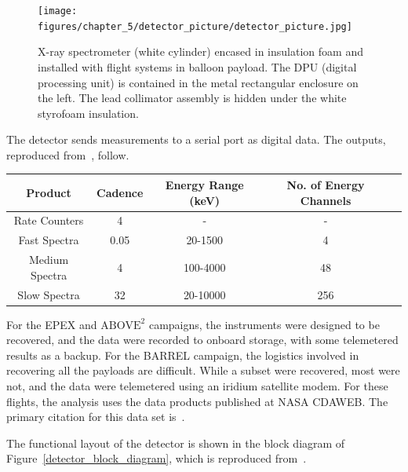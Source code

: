 \begin{figure}[p]
    \centering
    \texttt{[image: figures/chapter\_5/detector\_picture/detector\_picture.jpg]}
    \caption{X-ray spectrometer (white cylinder) encased in insulation foam and installed with flight systems in balloon payload. The DPU (digital processing unit) is contained in the metal rectangular enclosure on the left. The lead collimator assembly is hidden under the white styrofoam insulation.}
    \label{detector_picture}
\end{figure}

The detector sends measurements to a serial port as digital data. The outputs, reproduced from~\citet{Millan2014}, follow.

\begin{center}
\begin{tabular}{ |c|c|c|c|c| }
\hline
Product & Cadence & Energy Range (keV) & No. of Energy Channels \\
\hline
Rate Counters & 4 & - & - \\
Fast Spectra & 0.05 & 20-1500 & 4 \\
Medium Spectra & 4 & 100-4000 & 48 \\
Slow Spectra & 32 & 20-10000 & 256 \\
\hline
\end{tabular}
\end{center}

For the EPEX and $\text{ABOVE}^2$ campaigns, the instruments were designed to be recovered, and the data were recorded to onboard storage, with some telemetered results as a backup. For the BARREL campaign, the logistics involved in recovering all the payloads are difficult. While a subset were recovered, most were not, and the data were telemetered using an iridium satellite modem. For these flights, the analysis uses the data products published at NASA CDAWEB. The primary citation for this data set is~\citet{Millan2014}.

The functional layout of the detector is shown in the block diagram of Figure~\ref{detector_block_diagram}, which is reproduced from~\citet{Millan2014}.

